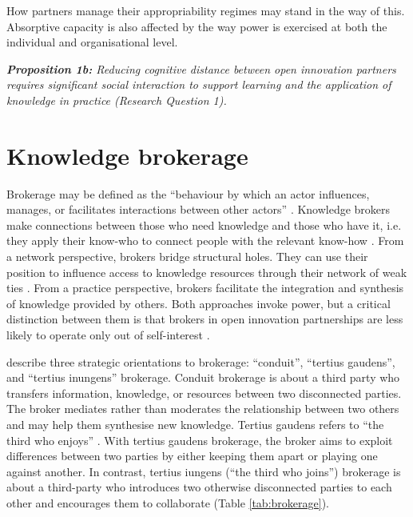  How partners manage their appropriability regimes may stand in the way of this. Absorptive capacity is also affected by the way power is exercised at both the individual and organisational level. \bigskip

\begin{tcolorbox}
\textit{\textbf{Proposition 1b:} Reducing cognitive distance between open innovation partners  requires  significant  social  interaction  to support learning and the application of knowledge in practice (Research Question 1).}
\end{tcolorbox}

\section{Knowledge brokerage}

Brokerage may be defined as the \enquote{behaviour by which an actor influences, manages, or facilitates interactions between other actors} \citep{obstfeld2014brokerage}. Knowledge brokers make connections between those who need knowledge and those who have it, i.e. they apply their know-who to connect people with the relevant know-how \citep{davenport1998working}. From a network perspective, brokers bridge structural holes. They can use their position to influence access to knowledge resources through their network of weak ties \citep{burt1992structural,hanneman2005introduction,davis2010agency,simpson2011network,stovel2012brokerage}. From a practice perspective, brokers facilitate the integration and synthesis of knowledge provided by others. Both approaches invoke power, but a critical distinction between them is that brokers in open innovation partnerships are less likely to operate only out of self-interest \citep{lingo2010nexus,marabelli2016strategic}. \medskip

\citet{obstfeld2014brokerage} describe three strategic orientations to brokerage: \enquote{conduit}, \enquote{tertius gaudens}, and \enquote{tertius inungens} brokerage. Conduit brokerage is about a third party who transfers information, knowledge, or resources between two disconnected parties. The broker mediates rather than moderates the relationship between two others and may help them synthesise new knowledge. Tertius gaudens refers to \enquote{the third who enjoys} \citep{simmel1950sociology}. With tertius gaudens brokerage, the broker aims to exploit differences between two parties by either keeping them apart or playing one against another. In contrast, tertius iungens (\enquote{the third who joins}) brokerage is about a third-party who introduces two otherwise disconnected parties to each other and encourages them to collaborate (Table \ref{tab:brokerage}). \medskip

